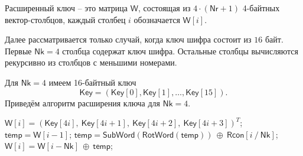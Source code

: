 Расширенный ключ -- это матрица $\mathsf{W}$, состоящая из $4 \cdot (\mathsf{Nr} + 1)$ 4-байтных вектор-столбцов, каждый столбец $i$ обозначается $\mathsf{W}[i]$.

Далее рассматривается только случай, когда ключ шифра состоит из $16$ байт. Первые $\mathsf{Nk} = 4$ столбца содержат ключ шифра. Остальные столбцы вычисляются рекурсивно из столбцов с меньшими номерами.

Для $\mathsf{Nk} = 4$ имеем 16-байтный ключ
\[
    \mathsf{Key} = (\mathsf{Key}[0], \mathsf{Key}[1], \dots, \mathsf{Key}[15]).
\]
Приведём алгоритм расширения ключа для $\mathsf{Nk} = 4$.
\begin{algorithm}[iht]
    \caption{$\mathsf{KeyExpansion}(\mathsf{Key}, \mathsf{W})$\label{alg:AES-key-exp}}
    \begin{algorithmic}
            \STATE $\mathsf{W}[i] = (\mathsf{Key}[4i], ~ \mathsf{Key}[4i+1], ~ \mathsf{Key}[4i+2], ~ \mathsf{Key}[4i+3])^T$;
        \ENDFOR
            \STATE $\mathsf{temp} = \mathsf{W}[i-1]$;
                \STATE $\mathsf{temp} = \mathsf{SubWord}(\mathsf{RotWord}(\mathsf{temp})) ~ \oplus ~ \mathsf{Rcon}[i ~/~ \mathsf{Nk}]$;
            \ENDIF
            \STATE $\mathsf{W}[i] = \mathsf{W}[i - \mathsf{Nk}] ~ \oplus ~ \mathsf{temp}$;
        \ENDFOR
    \end{algorithmic}
\end{algorithm}


